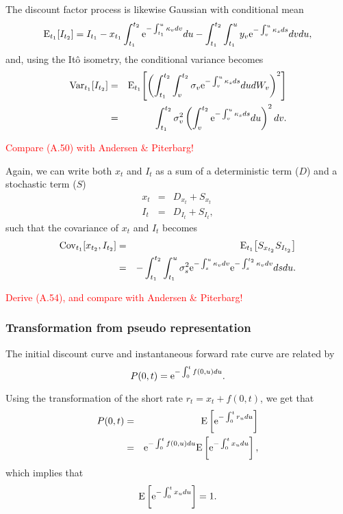 The discount factor process is likewise Gaussian with conditional mean
\begin{equation}
\mathrm{E}_{t_1}\! \left[ I_{t_{2}} \right] = I_{t_1} - x_{t_1} \int_{t_1}^{t_2} \text{e}^{-\int_{t_1}^{u} \kappa_v dv} du - \int_{t_1}^{t_2} \int_{t_1}^{u} y_v \text{e}^{-\int_v^{u} \kappa_s ds} dv du,
\end{equation}
and, using the It\^{o} isometry, the conditional variance becomes
\begin{eqnarray}
\mathrm{Var}_{t_1}\! \left[ I_{t_{2}} \right] &=& \mathrm{E}_{t_1}\! \left[ \left( \int_{t_1}^{t_2} \int_{v}^{t_2} \sigma_v \text{e}^{-\int_v^{u} \kappa_s ds} du dW_v \right)^2 \right] \\
&=& \int_{t_1}^{t_2} \sigma_v^2 \left( \int_{v}^{t_2} \text{e}^{-\int_v^{u} \kappa_s ds} du \right)^2 dv.
\end{eqnarray}

\textcolor{red}{Compare (A.50) with Andersen \& Piterbarg!}

Again, we can write both $x_t$ and $I_t$ as a sum of a deterministic term ($D$) and a stochastic term ($S$)
\begin{eqnarray}
x_t &=& D_{x_t} + S_{x_t} \\
I_t &=& D_{I_t} + S_{I_t},
\end{eqnarray}
such that the covariance of $x_t$ and $I_t$ becomes
\begin{eqnarray}
\mathrm{Cov}_{t_1}\! \left[ x_{t_2}, I_{t_2} \right] &=& \mathrm{E}_{t_1}\! \left[ S_{x_{t_2}} S_{I_{t_2}} \right] \\
&=& - \int_{t_1}^{t_2} \int_{t_1}^u \sigma_s^2 \text{e}^{-\int_s^{u} \kappa_v dv} \text{e}^{-\int_s^{t_2} \kappa_v dv} ds du.
\end{eqnarray}

\textcolor{red}{Derive (A.54), and compare with Andersen \& Piterbarg!}

\subsubsection{Transformation from pseudo representation}

The initial discount curve and instantaneous forward rate curve are related by
\begin{equation}
P(0,t) = \text{e}^{- \int_0^t f(0,u) du}.
\end{equation}

Using the transformation of the short rate $r_t = x_t + f(0,t)$, we get that
\begin{eqnarray}
P(0,t) &=& \mathrm{E} \left[ \text{e}^{- \int_0^t r_u du} \right] \\
&=& \text{e}^{- \int_0^t f(0,u) du} \mathrm{E} \left[ \text{e}^{- \int_0^t x_u du} \right],
\end{eqnarray}
which implies that
\begin{equation}
\mathrm{E} \left[ \text{e}^{- \int_0^t x_u du} \right] = 1.
\end{equation}

